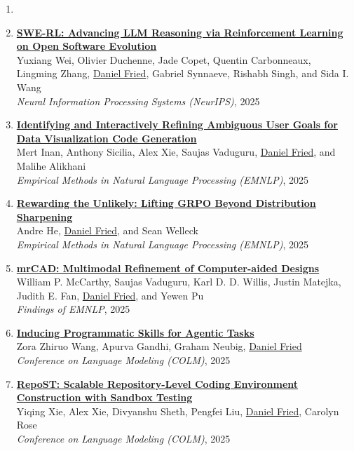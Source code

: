 \begin{enumerate}[leftmargin=-1mm,partopsep=0pt]
\item[]

\item \href{https://arxiv.org/abs/2502.18449}{\textbf{SWE-RL: Advancing LLM Reasoning via Reinforcement Learning on Open Software Evolution}} \\
  Yuxiang Wei, Olivier Duchenne, Jade Copet, Quentin Carbonneaux, Lingming Zhang, \underline{Daniel Fried}, Gabriel Synnaeve, Rishabh Singh, and Sida I. Wang\\
  \emph{Neural Information Processing Systems (NeurIPS)}, 2025

\item \href{https://arxiv.org/abs/2510.09390}{\textbf{Identifying and Interactively Refining Ambiguous User Goals for Data Visualization Code Generation}} \\
  Mert Inan, Anthony Sicilia, Alex Xie, Saujas Vaduguru, \underline{Daniel Fried}, and Malihe Alikhani\\
  \emph{Empirical Methods in Natural Language Processing (EMNLP)}, 2025

\item \href{https://arxiv.org/abs/2506.02355}{\textbf{Rewarding the Unlikely: Lifting GRPO Beyond Distribution Sharpening}} \\
  Andre He, \underline{Daniel Fried}, and Sean Welleck\\
  \emph{Empirical Methods in Natural Language Processing (EMNLP)}, 2025

\item \href{https://arxiv.org/abs/2504.20294}{\textbf{mrCAD: Multimodal Refinement of Computer-aided Designs}} \\
  William P. McCarthy, Saujas Vaduguru, Karl D. D. Willis, Justin Matejka, Judith E. Fan, \underline{Daniel Fried}, and Yewen Pu\\
  \emph{Findings of EMNLP}, 2025

\item \href{https://arxiv.org/abs/2504.06821}{\textbf{Inducing Programmatic Skills for Agentic Tasks}} \\
  Zora Zhiruo Wang, Apurva Gandhi, Graham Neubig, \underline{Daniel Fried}\\
  \emph{Conference on Language Modeling (COLM)}, 2025

\item \href{https://arxiv.org/abs/2503.07358}{\textbf{RepoST: Scalable Repository-Level Coding Environment Construction with Sandbox Testing}} \\
  Yiqing Xie, Alex Xie, Divyanshu Sheth, Pengfei Liu, \underline{Daniel Fried}, Carolyn Rose\\
  \emph{Conference on Language Modeling (COLM)}, 2025


\end{enumerate}
